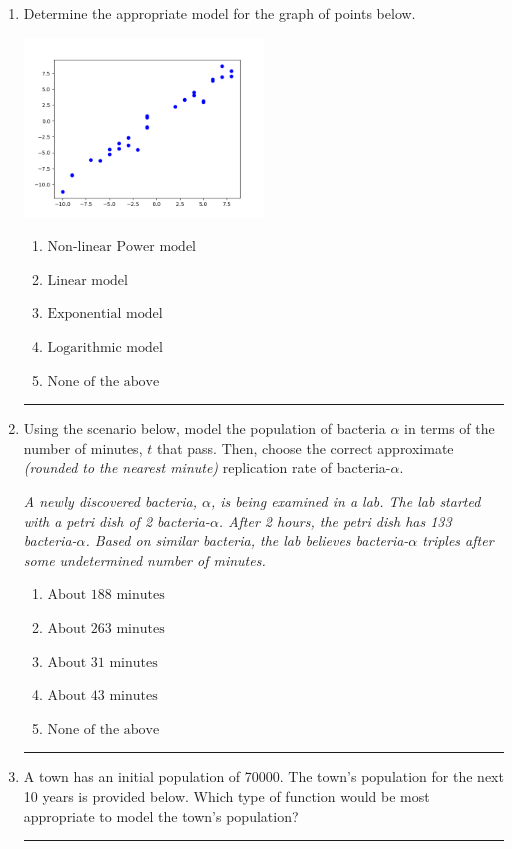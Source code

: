 \documentclass[14pt]{extbook}
\newcommand{\litem}[1]{\item#1\hspace*{-1cm}\rule{\textwidth}{0.4pt}}
\begin{document}
\begin{enumerate}
{\begin{enumerate}[label=\Alph*.]
\end{enumerate} }
\litem{
Determine the appropriate model for the graph of points below.
\begin{center}
    \includegraphics[width=0.5\textwidth]{../Figures/identifyModelGraph11CopyA.png}
\end{center}
\begin{enumerate}[label=\Alph*.]
\item \( \text{Non-linear Power model} \)
\item \( \text{Linear model} \)
\item \( \text{Exponential model} \)
\item \( \text{Logarithmic model} \)
\item \( \text{None of the above} \)

\end{enumerate} }
\litem{
Using the scenario below, model the population of bacteria $\alpha$ in terms of the number of minutes, $t$ that pass. Then, choose the correct approximate \textit{(rounded to the nearest minute)} replication rate of bacteria-$\alpha$.
\begin{center}
    \textit{ A newly discovered bacteria, $\alpha$, is being examined in a lab. The lab started with a petri dish of 2 bacteria-$\alpha$. After 2 hours, the petri dish has 133 bacteria-$\alpha$. Based on similar bacteria, the lab believes bacteria-$\alpha$ triples after some undetermined number of minutes. }
\end{center}
\begin{enumerate}[label=\Alph*.]
\item \( \text{About } 188 \text{ minutes} \)
\item \( \text{About } 263 \text{ minutes} \)
\item \( \text{About } 31 \text{ minutes} \)
\item \( \text{About } 43 \text{ minutes} \)
\item \( \text{None of the above} \)

\end{enumerate} }
\litem{
A town has an initial population of 70000. The town's population for the next 10 years is provided below. Which type of function would be most appropriate to model the town's population?

}
\end{enumerate}
\end{document}
